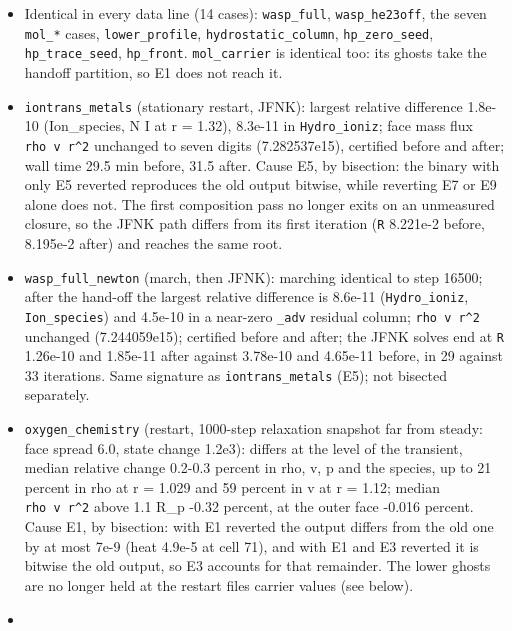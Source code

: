 \documentclass[english,a4paper]{my_memo}
\providecommand{\tightlist}{\setlength{\itemsep}{0pt}\setlength{\parskip}{0pt}}
\begin{document}
\begin{itemize}
  \begin{itemize}
  \tightlist
  \item
    Identical in every data line (14 cases): \texttt{wasp\_full}, \texttt{wasp\_he23off}, the seven \texttt{mol\_*} cases, \texttt{lower\_profile}, \texttt{hydrostatic\_column}, \texttt{hp\_zero\_seed}, \texttt{hp\_trace\_seed}, \texttt{hp\_front}. \texttt{mol\_carrier} is identical too: its ghosts take the handoff partition, so E1 does not reach it.
  \item
    \texttt{iontrans\_metals} (stationary restart, JFNK): largest relative difference 1.8e-10 (Ion\_species, N I at r = 1.32), 8.3e-11 in \texttt{Hydro\_ioniz}; face mass flux \texttt{rho\ v\ r\^{}2} unchanged to seven digits (7.282537e15), certified before and after; wall time 29.5 min before, 31.5 after. Cause E5, by bisection: the binary with only E5 reverted reproduces the old output bitwise, while reverting E7 or E9 alone does not. The first composition pass no longer exits on an unmeasured closure, so the JFNK path differs from its first iteration (\texttt{\textbar{}\textbar{}R\textbar{}\textbar{}} 8.221e-2 before, 8.195e-2 after) and reaches the same root.
  \item
    \texttt{wasp\_full\_newton} (march, then JFNK): marching identical to step 16500; after the hand-off the largest relative difference is 8.6e-11 (\texttt{Hydro\_ioniz}, \texttt{Ion\_species}) and 4.5e-10 in a near-zero \texttt{\_adv} residual column; \texttt{rho\ v\ r\^{}2} unchanged (7.244059e15); certified before and after; the JFNK solves end at \texttt{\textbar{}\textbar{}R\textbar{}\textbar{}} 1.26e-10 and 1.85e-11 after against 3.78e-10 and 4.65e-11 before, in 29 against 33 iterations. Same signature as \texttt{iontrans\_metals} (E5); not bisected separately.
  \item
    \texttt{oxygen\_chemistry} (restart, 1000-step relaxation snapshot far from steady: face spread 6.0, state change 1.2e3): differs at the level of the transient, median relative change 0.2-0.3 percent in rho, v, p and the species, up to 21 percent in rho at r = 1.029 and 59 percent in v at r = 1.12; median \texttt{rho\ v\ r\^{}2} above 1.1 R\_p -0.32 percent, at the outer face -0.016 percent. Cause E1, by bisection: with E1 reverted the output differs from the old one by at most 7e-9 (heat 4.9e-5 at cell 71), and with E1 and E3 reverted it is bitwise the old output, so E3 accounts for that remainder. The lower ghosts are no longer held at the restart file\textquotesingle s carrier values (see below).
  \item

\end{itemize}
\end{itemize}
\end{document}
